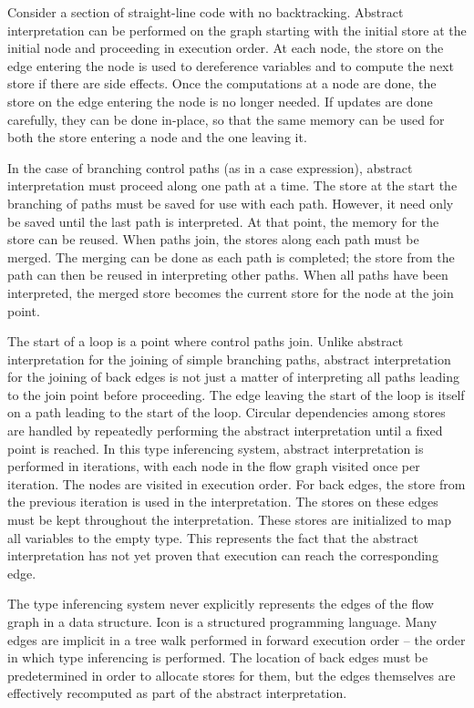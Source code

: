 Consider a section of straight-line code with no
backtracking. Abstract interpretation can be performed on the graph
starting with the initial store at the initial node and proceeding in
execution order. At each node, the store on the edge entering the node
is used to dereference variables and to compute the next store if
there are side effects. Once the computations at a node are done, the
store on the edge entering the node is no longer needed. If updates
are done carefully, they can be done in-place, so that the same memory
can be used for both the store entering a node and the one leaving it.

In the case of branching control paths (as in a case expression),
abstract interpretation must proceed along one path at a time. The
store at the start the branching of paths must be saved for use with
each path. However, it need only be saved until the last path is
interpreted. At that point, the memory for the store can be
reused. When paths join, the stores along each path must be
merged. The merging can be done as each path is completed; the store
from the path can then be reused in interpreting other paths. When all
paths have been interpreted, the merged store becomes the current
store for the node at the join point.

The start of a loop is a point where control paths join. Unlike
abstract interpretation for the joining of simple branching paths,
abstract interpretation for the joining of back edges is not just a
matter of interpreting all paths leading to the join point before
proceeding. The edge leaving the start of the loop is itself on a path
leading to the start of the loop. Circular dependencies among stores
are handled by repeatedly performing the abstract interpretation until
a fixed point is reached. In this type inferencing system, abstract
interpretation is performed in iterations, with each node in the flow
graph visited once per iteration. The nodes are visited in execution
order. For back edges, the store from the previous iteration is used
in the interpretation. The stores on these edges must be kept
throughout the interpretation. These stores are initialized to map all
variables to the empty type. This represents the fact that the
abstract interpretation has not yet proven that execution can reach
the corresponding edge.

The type inferencing system never explicitly represents the edges of
the flow graph in a data structure. Icon is a structured programming
language. Many edges are implicit in a tree walk performed in forward
execution order -- the order in which type inferencing is
performed. The location of back edges must be predetermined in order
to allocate stores for them, but the edges themselves are effectively
recomputed as part of the abstract interpretation.

